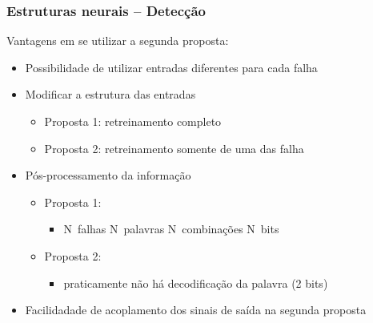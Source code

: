 \documentclass{beamer}
\begin{document}
\begin{frame}
    \frametitle{Estruturas neurais -- Detecção}

    Vantagens em se utilizar a segunda proposta:

\begin{itemize}
    \item Possibilidade de utilizar entradas diferentes para cada falha
    \item Modificar a estrutura das entradas
    \begin{itemize}
        \item Proposta 1: retreinamento completo
        \item Proposta 2: retreinamento somente de uma das falha
    \end{itemize}
    \item Pós-processamento da informação
    \begin{itemize}
        \item Proposta 1: 
        \begin{itemize}
            \item N\textordmasculine\ falhas \implica N\textordmasculine\
                  palavras \implica N\textordmasculine\ combinações \implica 
                  N\textordmasculine\ bits
        \end{itemize}
        \item Proposta 2: 
        \begin{itemize}
            \item praticamente não há decodificação da palavra (2 bits)
        \end{itemize}
    \end{itemize}
    \item Facilidadade de acoplamento dos sinais de saída na segunda proposta
\end{itemize}

\end{frame}

\end{document}
